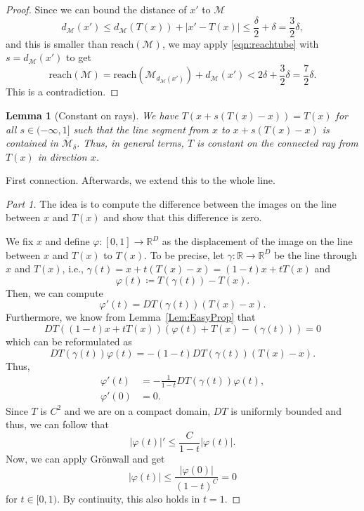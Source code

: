 \documentclass[11pt]{amsart}%
\theoremstyle{plain}
\newtheorem{lemma}[definition]{Lemma}
\newcommand{\1}{\mathbf{1}}
\newcommand{\M}{\mathcal{M}}
\begin{document}
\begin{proof}
    Since we can bound the distance of $x'$ to $\M$
    $$d_\M(x')\le d_\M(T(x))+|x'-T(x)|\le \frac{\delta}{2}+\delta=\frac{3}{2}\delta,$$ and this
    is smaller than $\text{reach}(\M)$, we may apply \eqref{eqn:reachtube} with $s=d_\M(x')$ to get
    $$\text{reach}(\M)= \text{reach}(\M_{d_\M(x')})+d_\M(x')< 2\delta+\frac{3}{2}\delta=\frac{7}{2}\delta.$$
    This is a contradiction.
\end{proof}

\begin{lemma}[Constant on rays]
    We have $T(x+s(T(x)-x)) = T(x)$ for all $s \in (-\infty,1]$ such that the line segment from $x$ to $x+s(T(x)-x)$ is contained in $\overline{\M}_\delta$. Thus, in general terms, $T$ is constant on the connected ray from $T(x)$ in direction $x$.
    \label{Lem:RayConst}
\end{lemma}

First connection.
Afterwards, we extend this to the whole line.

\begin{proof}[Part 1]
    The idea is to compute the difference between the images on the line between $x$ and $T(x)$ and show that this difference is zero. 

    We fix $x$ and define $\varphi:[0,1]\to\mathbb{R}^D$ as the displacement of the image on the line between $x$ and $T(x)$ to $T(x)$. To be precise, let $\gamma:\mathbb{R}\to\mathbb{R}^D$ be the line through $x$ and $T(x)$, i.e., $\gamma(t)=x+t(T(x)-x)=(1-t)x+tT(x)$ and
    $$\varphi(t)\coloneqq T(\gamma(t))-T(x).$$
    Then, we can compute
    $$\varphi'(t)=DT(\gamma(t))(T(x)-x).$$
    Furthermore, we know from Lemma~\ref{Lem:EasyProp} that
    $$DT((1-t)x+tT(x))(\varphi(t)+T(x)-(\gamma(t)))=0$$
    which can be reformulated as
    $$DT(\gamma(t))\varphi(t)=-(1-t)DT(\gamma(t))(T(x)-x).$$
    Thus, 
    \begin{align*}
        \varphi'(t)&=-\frac{1}{1-t}DT(\gamma(t))\varphi(t),\\
        \varphi'(0)&=0.
    \end{align*}
    Since $T$ is $C^2$ and we are on a compact domain, $DT$ is uniformly bounded and thus, we can follow that 
    $$|\varphi(t)|'\leq \frac{C}{1-t}|\varphi(t)|.$$
    Now, we can apply Grönwall and get
    $$|\varphi(t)|\leq \frac{|\varphi(0)|}{(1-t)^C}=0$$
    for $t\in [0,1)$. By continuity, this also holds in $t=1$.
\end{proof}
\end{document}
